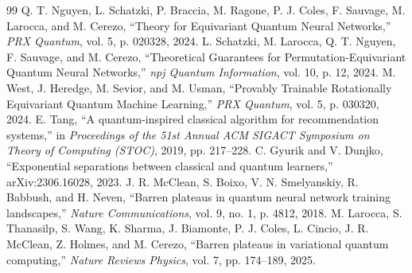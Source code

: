 \documentclass[journal]{IEEEtran}
\begin{document}
\begin{thebibliography}{99}
 Q. T. Nguyen, L. Schatzki, P. Braccia, M. Ragone, P. J. Coles, F. Sauvage, M. Larocca, and M. Cerezo, ``Theory for Equivariant Quantum Neural Networks,'' \textit{PRX Quantum}, vol. 5, p. 020328, 2024.
 L. Schatzki, M. Larocca, Q. T. Nguyen, F. Sauvage, and M. Cerezo, ``Theoretical Guarantees for Permutation-Equivariant Quantum Neural Networks,'' \textit{npj Quantum Information}, vol. 10, p. 12, 2024.
 M. West, J. Heredge, M. Sevior, and M. Usman, ``Provably Trainable Rotationally Equivariant Quantum Machine Learning,'' \textit{PRX Quantum}, vol. 5, p. 030320, 2024.
 E. Tang, ``A quantum-inspired classical algorithm for recommendation systems,'' in \textit{Proceedings of the 51st Annual ACM SIGACT Symposium on Theory of Computing (STOC)}, 2019, pp. 217--228.
 C. Gyurik and V. Dunjko, ``Exponential separations between classical and quantum learners,'' arXiv:2306.16028, 2023.
 J. R. McClean, S. Boixo, V. N. Smelyanskiy, R. Babbush, and H. Neven, ``Barren plateaus in quantum neural network training landscapes,'' \textit{Nature Communications}, vol. 9, no. 1, p. 4812, 2018.
 M. Larocca, S. Thanasilp, S. Wang, K. Sharma, J. Biamonte, P. J. Coles, L. Cincio, J. R. McClean, Z. Holmes, and M. Cerezo, ``Barren plateaus in variational quantum computing,'' \textit{Nature Reviews Physics}, vol. 7, pp. 174--189, 2025.
\end{thebibliography}
\end{document}
